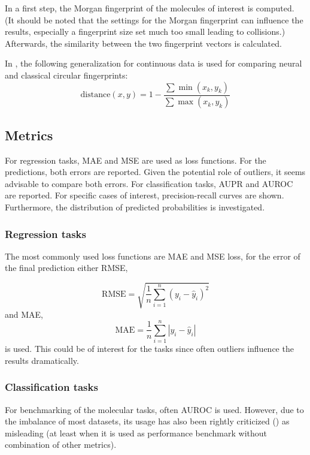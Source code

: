 In a first step, the Morgan fingerprint of the molecules of interest is computed.
(It should be noted that the settings for the Morgan fingerprint can influence the results, especially a fingerprint size set much too small leading to collisions.) Afterwards, the similarity between the two fingerprint vectors is calculated.





In \cite{Duvenaud.30.09.2015}, the following generalization for continuous data is used for comparing neural and classical circular fingerprints:
\[
\text{distance}(x, y) = 1 - \frac{\sum \min(x_k, y_k)}{\sum \max(x_k, y_k)}
\]


\subsection{Metrics}


For regression tasks, MAE and MSE are used as loss functions. For the predictions, both errors are reported. 
Given the potential role of outliers, it seems advisable to compare both errors.
For classification tasks, AUPR and AUROC are reported. For specific cases of interest, precision-recall curves are shown.
Furthermore, the distribution of predicted probabilities is investigated.


\subsubsection{Regression tasks}

The most commonly used loss functions are MAE and MSE loss, for the error of the final prediction either RMSE, 

\begin{equation}
\text{RMSE} = \sqrt{\frac{1}{n} \sum_{i=1}^{n} (y_i - \hat{y}_i)^2}
\end{equation}
and MAE, 
\begin{equation}
\text{MAE} = \frac{1}{n} \sum_{i=1}^{n} |y_i - \hat{y}_i|
\end{equation}
is used.
This could be of interest for the tasks since often outliers influence the results dramatically.


\subsubsection{Classification tasks}


For benchmarking of the molecular tasks, often AUROC is used. However, due to the imbalance of most datasets, its usage has also been rightly criticized (\cite{Robinson.2020}) as misleading (at least when it is used as performance benchmark without combination of other metrics).

